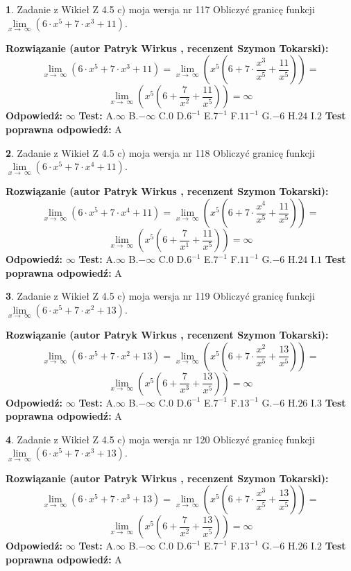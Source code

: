 \documentclass[12pt, a4paper]{article}
\theoremstyle{definition} %
\newtheorem{zad}{}
\newcommand{\zadStart}[1]{\begin{zad}#1\newline}
\newcommand{\zadStop}{\end{zad}}
\newcommand{\rozwStart}[2]{\noindent \textbf{Rozwiązanie (autor #1 , recenzent #2): }\newline}
\newcommand{\rozwStop}{\newline}
\newcommand{\odpStart}{\noindent \textbf{Odpowiedź:}\newline}
\newcommand{\odpStop}{\newline}
\newcommand{\testStart}{\noindent \textbf{Test:}\newline}
\newcommand{\testStop}{\newline}
\newcommand{\kluczStart}{\noindent \textbf{Test poprawna odpowiedź:}\newline}
\newcommand{\kluczStop}{\newline}
\begin{document}
\zadStart{Zadanie z Wikieł Z 4.5 c) moja wersja nr 117}
Obliczyć granicę funkcji  $\lim\limits_{x\to\ \infty}(6 \cdot x^{5}+7 \cdot x^{3}+11)$.
\zadStop
\rozwStart{Patryk Wirkus}{Szymon Tokarski}
$$\lim\limits_{x\to\ \infty}(6 \cdot x^{5}+7 \cdot x^{3}+11) = \lim\limits_{x\to\ \infty}(x^{5}(6 +7 \cdot \frac{x^{3}}{x^{5}}+\frac{11}{x^{5}})) =$$ $$\lim\limits_{x\to\ \infty}(x^{5}(6 +\frac{7}{x^{2}}+\frac{11}{x^{5}})) =\infty$$
\rozwStop
\odpStart
$\infty$
\odpStop
\testStart
A.$\infty$ B.$-\infty$ C.$0$ D.$6^{-1}$ E.$7^{-1}$
F.$11^{-1}$ G.$-6$
H.$24$
I.$2$
\testStop
\kluczStart
A
\kluczStop



\zadStart{Zadanie z Wikieł Z 4.5 c) moja wersja nr 118}
Obliczyć granicę funkcji  $\lim\limits_{x\to\ \infty}(6 \cdot x^{5}+7 \cdot x^{4}+11)$.
\zadStop
\rozwStart{Patryk Wirkus}{Szymon Tokarski}
$$\lim\limits_{x\to\ \infty}(6 \cdot x^{5}+7 \cdot x^{4}+11) = \lim\limits_{x\to\ \infty}(x^{5}(6 +7 \cdot \frac{x^{4}}{x^{5}}+\frac{11}{x^{5}})) =$$ $$\lim\limits_{x\to\ \infty}(x^{5}(6 +\frac{7}{x^{1}}+\frac{11}{x^{5}})) =\infty$$
\rozwStop
\odpStart
$\infty$
\odpStop
\testStart
A.$\infty$ B.$-\infty$ C.$0$ D.$6^{-1}$ E.$7^{-1}$
F.$11^{-1}$ G.$-6$
H.$24$
I.$1$
\testStop
\kluczStart
A
\kluczStop



\zadStart{Zadanie z Wikieł Z 4.5 c) moja wersja nr 119}
Obliczyć granicę funkcji  $\lim\limits_{x\to\ \infty}(6 \cdot x^{5}+7 \cdot x^{2}+13)$.
\zadStop
\rozwStart{Patryk Wirkus}{Szymon Tokarski}
$$\lim\limits_{x\to\ \infty}(6 \cdot x^{5}+7 \cdot x^{2}+13) = \lim\limits_{x\to\ \infty}(x^{5}(6 +7 \cdot \frac{x^{2}}{x^{5}}+\frac{13}{x^{5}})) =$$ $$\lim\limits_{x\to\ \infty}(x^{5}(6 +\frac{7}{x^{3}}+\frac{13}{x^{5}})) =\infty$$
\rozwStop
\odpStart
$\infty$
\odpStop
\testStart
A.$\infty$ B.$-\infty$ C.$0$ D.$6^{-1}$ E.$7^{-1}$
F.$13^{-1}$ G.$-6$
H.$26$
I.$3$
\testStop
\kluczStart
A
\kluczStop



\zadStart{Zadanie z Wikieł Z 4.5 c) moja wersja nr 120}
Obliczyć granicę funkcji  $\lim\limits_{x\to\ \infty}(6 \cdot x^{5}+7 \cdot x^{3}+13)$.
\zadStop
\rozwStart{Patryk Wirkus}{Szymon Tokarski}
$$\lim\limits_{x\to\ \infty}(6 \cdot x^{5}+7 \cdot x^{3}+13) = \lim\limits_{x\to\ \infty}(x^{5}(6 +7 \cdot \frac{x^{3}}{x^{5}}+\frac{13}{x^{5}})) =$$ $$\lim\limits_{x\to\ \infty}(x^{5}(6 +\frac{7}{x^{2}}+\frac{13}{x^{5}})) =\infty$$
\rozwStop
\odpStart
$\infty$
\odpStop
\testStart
A.$\infty$ B.$-\infty$ C.$0$ D.$6^{-1}$ E.$7^{-1}$
F.$13^{-1}$ G.$-6$
H.$26$
I.$2$
\testStop
\kluczStart
A
\kluczStop
\end{document}
